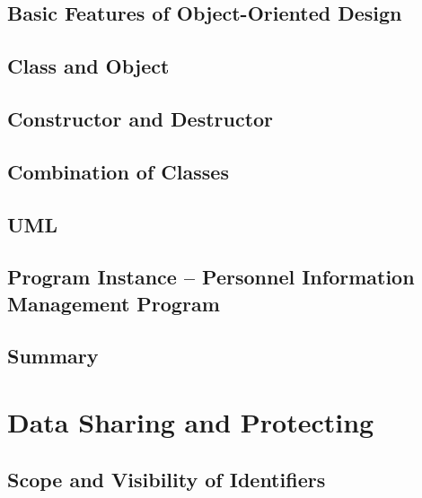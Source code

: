 \documentclass[a4paper]{article}
\begin{document}
\subsection{Basic Features of Object-Oriented Design}

\subsection{Class and Object}

\subsection{Constructor and Destructor}

\subsection{Combination of Classes}

\subsection{UML}

\subsection{Program Instance – Personnel Information Management Program}

\subsection{Summary}


\newpage
\section{Data Sharing and Protecting}
\subsection{Scope and Visibility of Identifiers}
\end{document}

